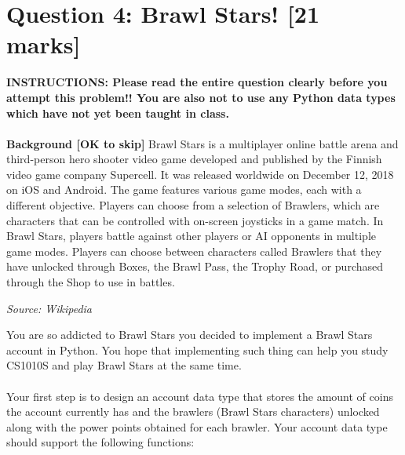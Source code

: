 \newpage
\section{Question 4: Brawl Stars! [21 marks]}
\textbf{INSTRUCTIONS: Please read the entire question clearly before you attempt this problem!! 
You are also not to use any Python data types which have not yet been taught in class.} \\ \\
\textbf{Background [OK to skip]} Brawl Stars is a multiplayer online battle arena and third-person hero shooter video 
game developed and published by the Finnish video game company Supercell. It was released worldwide on December 12, 2018 
on iOS and Android. The game features various game modes, each with a different objective. Players can choose from a 
selection of Brawlers, which are characters that can be controlled with on-screen joysticks in a game match. In Brawl 
Stars, players battle against other players or AI opponents in multiple game modes. Players can choose between characters 
called Brawlers that they have unlocked through Boxes, the Brawl Pass, the Trophy Road, or purchased through the Shop to 
use in battles.
\begin{flushright}
    \textit{Source: Wikipedia}
\end{flushright}

\vspace{5 mm}

You are so addicted to Brawl Stars you decided to implement a Brawl Stars account in Python. You hope that implementing such thing 
can help you study CS1010S and play Brawl Stars at the same time. \\ \\
Your first step is to design an account data type that stores the amount of coins the account currently has and the brawlers 
(Brawl Stars characters) unlocked along with the power points obtained for each brawler. Your account data type should support the 
following functions:

